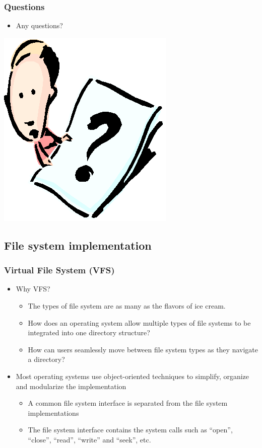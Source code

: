 \documentclass[CJKutf8,xcolor=pdftex,dvipsnames,table]{beamer}
\begin{document}
\begin{CJK*}{UTF8}{song}
  \begin{frame}
    \frametitle{Questions}
    \begin{itemize}
    \item Any questions?
    \end{itemize}
    \begin{center}
      \includegraphics[scale=.5]{question}
    \end{center}
  \end{frame}
  
  \subsection{File system implementation}

  \begin{frame}
    \frametitle{Virtual File System (VFS)} \pause
    \begin{itemize}\parskip=0pt
    \item Why VFS? \pause
      \begin{itemize}\parskip=0pt
      \item The types of file system are as many as the flavors of ice cream. \pause
      \item How does an operating system allow multiple types of file systems to be integrated into one directory structure? \pause
      \item How can users seamlessly move between file system types as they navigate a directory? \pause
      \end{itemize}
    \item Most operating systems use object-oriented techniques to simplify, organize and modularize the implementation \pause
      \begin{itemize}\parskip=0pt
      \item A common file system interface is separated from the file system implementations \pause
      \item The file system interface contains the system calls such as ``open'', ``close'', ``read'', ``write'' and ``seek'', etc.
      \end{itemize}
    \end{itemize}
  \end{frame}
  

\end{CJK*}
\end{document}

